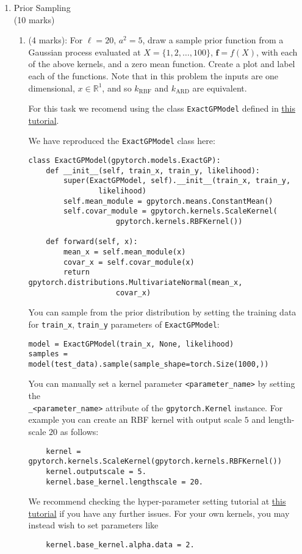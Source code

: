\documentclass[11pt]{article}
\newcommand{\mbf}[1]{{\boldsymbol{\mathbf{#1}}}}
\renewcommand{\bm}{\mbf}
\begin{document}
\begin{enumerate}
\item Prior Sampling \\
(10 marks)

\begin{enumerate}[label=(\alph*)]
\item (4 marks): For $\ell = 20$, $a^2 = 5$, draw a sample prior function from a Gaussian process evaluated at $X = \{1,2,\dots,100\}$, $\bm{f} = f(X)$, with each of the above kernels, and a zero mean function.  Create a plot and label each of the functions.  Note that in this problem the inputs are one dimensional, $x \in \mathbb{R}^1$, and so 
$k_{\text{RBF}}$ and $k_{\text{ARD}}$ are equivalent.

For this task we recomend using the class \texttt{ExactGPModel} defined in 
\href{https://gpytorch.readthedocs.io/en/latest/examples/01_Simple_GP_Regression/Simple_GP_Regression.html}{this tutorial}.

We have reproduced the \texttt{ExactGPModel} class here:
\begin{lstlisting}
class ExactGPModel(gpytorch.models.ExactGP):
	def __init__(self, train_x, train_y, likelihood):
		super(ExactGPModel, self).__init__(train_x, train_y, 
				likelihood)
		self.mean_module = gpytorch.means.ConstantMean()
		self.covar_module = gpytorch.kernels.ScaleKernel(
					gpytorch.kernels.RBFKernel())

	def forward(self, x):
		mean_x = self.mean_module(x)
		covar_x = self.covar_module(x)
		return gpytorch.distributions.MultivariateNormal(mean_x, 
					covar_x)
\end{lstlisting}
You can sample from the prior distribution by setting the training data for 
\texttt{train\_x}, \texttt{train\_y} parameters of \texttt{ExactGPModel}:
\begin{lstlisting}
model = ExactGPModel(train_x, None, likelihood)
samples = model(test_data).sample(sample_shape=torch.Size(1000,))
\end{lstlisting}
You can manually set a kernel parameter \texttt{<parameter\_name>} by setting the \\
\texttt{\_<parameter\_name>} attribute of
the \texttt{gpytorch.Kernel} instance. For example you can create an RBF kernel with
output scale $5$ and length-scale $20$ as follows:
\begin{lstlisting}
    kernel = gpytorch.kernels.ScaleKernel(gpytorch.kernels.RBFKernel())
    kernel.outputscale = 5.
    kernel.base_kernel.lengthscale = 20.
\end{lstlisting}
We recommend checking the hyper-parameter setting tutorial at \href{https://gpytorch.readthedocs.io/en/latest/examples/00_Basic_Usage/Hyperparameters.html}{this tutorial} if you have any further issues. For your own kernels, you may instead wish to set parameters like
\begin{lstlisting}
    kernel.base_kernel.alpha.data = 2.
\end{lstlisting}


\end{enumerate}
\end{enumerate}
\end{document}
